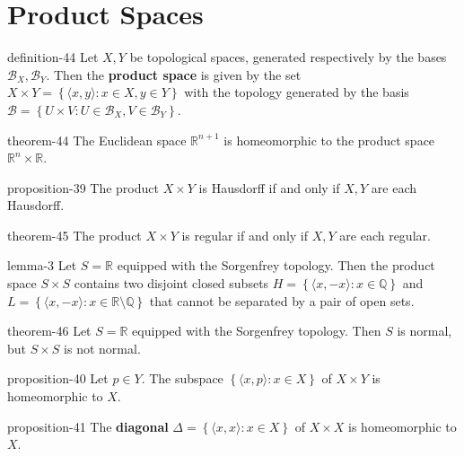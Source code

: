 \documentclass[10pt,]{article}
\newcommand{\terminology}[1]{\textbf{#1}}
\newcommand{\tuple}[1]{\langle #1 \rangle}
\newcommand{\mb}{\mathbb}
\newcommand{\mc}{\mathcal}
\newcommand{\setBuilder}[2]{\left\{#1:#2\right\}}
\begin{document}
\section[{Product Spaces}]{Product Spaces}\label{section-product}
\begin{definition}{}{definition-44}%
\hypertarget{p-173}{}%
Let \(X,Y\) be topological spaces, generated respectively by the bases \(\mc B_X,\mc B_Y\). Then the \terminology{product space} is given by the set \(X\times Y=\setBuilder{\tuple{x,y}}{x\in X,y\in Y}\) with the topology generated by the basis \(\mc B=\setBuilder{U\times V}{U\in\mc B_X,V\in\mc B_Y}\).%
\end{definition}
\begin{theorem}{}{}{theorem-44}%
\hypertarget{p-174}{}%
The Euclidean space \(\mb R^{n+1}\) is homeomorphic to the product space \(\mb R^n\times\mb R\).%
\end{theorem}
\begin{proposition}{}{}{proposition-39}%
\hypertarget{p-175}{}%
The product \(X\times Y\) is Hausdorff if and only if \(X,Y\) are each Hausdorff.%
\end{proposition}
\begin{theorem}{}{}{theorem-45}%
\hypertarget{p-176}{}%
The product \(X\times Y\) is regular if and only if \(X,Y\) are each regular.%
\end{theorem}
\begin{lemma}{}{}{lemma-3}%
\hypertarget{p-177}{}%
Let \(S=\mb R\) equipped with the Sorgenfrey topology. Then the product space \(S\times S\) contains two disjoint closed subsets \(H=\setBuilder{\tuple{x,-x}}{x\in\mb Q}\) and \(L=\setBuilder{\tuple{x,-x}}{x\in\mb R\setminus\mb Q}\) that cannot be separated by a pair of open sets.%
\end{lemma}
\begin{theorem}{}{}{theorem-46}%
\hypertarget{p-178}{}%
Let \(S=\mb R\) equipped with the Sorgenfrey topology. Then \(S\) is normal, but \(S\times S\) is not normal.%
\end{theorem}
\begin{proposition}{}{}{proposition-40}%
\hypertarget{p-179}{}%
Let \(p\in Y\). The subspace \(\setBuilder{\tuple{x,p}}{x\in X}\) of \(X\times Y\) is homeomorphic to \(X\).%
\end{proposition}
\begin{proposition}{}{}{proposition-41}%
\hypertarget{p-180}{}%
The \terminology{diagonal} \(\Delta=\setBuilder{\tuple{x,x}}{x\in X}\) of \(X\times X\) is homeomorphic to \(X\).%
\end{proposition}
\end{document}
